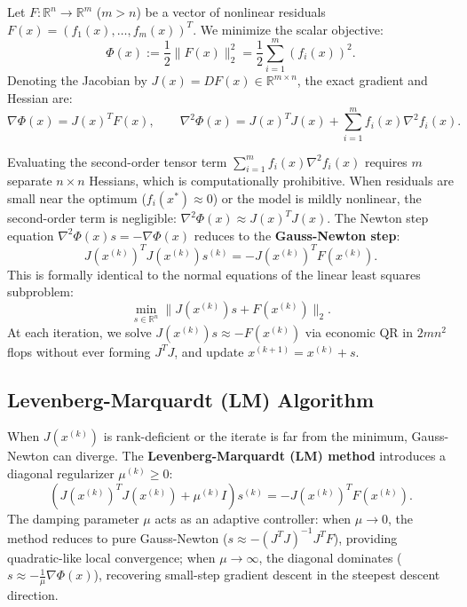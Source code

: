 Let $F: \mathbb{R}^n \to \mathbb{R}^{m}$ ($m > n$) be a vector of nonlinear residuals $F(x) = (f_1(x), \dots, f_m(x))^T$. We minimize the scalar objective:
\begin{equation}
    \Phi(x) := \frac{1}{2} \|F(x)\|_2^2 = \frac{1}{2} \sum_{i=1}^{m} (f_i(x))^2.
\end{equation}
Denoting the Jacobian by $J(x) = DF(x) \in \mathbb{R}^{m \times n}$, the exact gradient and Hessian are:
\begin{equation}
    \nabla \Phi(x) = J(x)^T F(x), \qquad \nabla^2 \Phi(x) = J(x)^T J(x) + \sum_{i=1}^{m} f_i(x) \nabla^2 f_i(x).
\end{equation}

Evaluating the second-order tensor term $\sum_{i=1}^m f_i(x) \nabla^2 f_i(x)$ requires $m$ separate $n \times n$ Hessians, which is computationally prohibitive. When residuals are small near the optimum ($f_i(x^*) \approx 0$) or the model is mildly nonlinear, the second-order term is negligible: $\nabla^2 \Phi(x) \approx J(x)^T J(x)$. The Newton step equation $\nabla^2 \Phi(x) s = -\nabla \Phi(x)$ reduces to the \textbf{Gauss-Newton step}:
\begin{equation}
    J(x^{(k)})^T J(x^{(k)}) s^{(k)} = -J(x^{(k)})^T F(x^{(k)}).
\end{equation}
This is formally identical to the normal equations of the linear least squares subproblem:
\begin{equation}
    \min_{s \in \mathbb{R}^n} \|J(x^{(k)}) s + F(x^{(k)})\|_2.
\end{equation}
At each iteration, we solve $J(x^{(k)}) s \approx -F(x^{(k)})$ via economic QR in $2m n^2$ flops without ever forming $J^T J$, and update $x^{(k+1)} = x^{(k)} + s$.

\subsection{Levenberg-Marquardt (LM) Algorithm}

When $J(x^{(k)})$ is rank-deficient or the iterate is far from the minimum, Gauss-Newton can diverge. The \textbf{Levenberg-Marquardt (LM) method} introduces a diagonal regularizer $\mu^{(k)} \ge 0$:
\begin{equation}
    \left( J(x^{(k)})^T J(x^{(k)}) + \mu^{(k)} I \right) s^{(k)} = -J(x^{(k)})^T F(x^{(k)}).
\end{equation}
The damping parameter $\mu$ acts as an adaptive controller: when $\mu \to 0$, the method reduces to pure Gauss-Newton ($s \approx -(J^T J)^{-1} J^T F$), providing quadratic-like local convergence; when $\mu \to \infty$, the diagonal dominates ($s \approx -\frac{1}{\mu} \nabla \Phi(x)$), recovering small-step gradient descent in the steepest descent direction.

